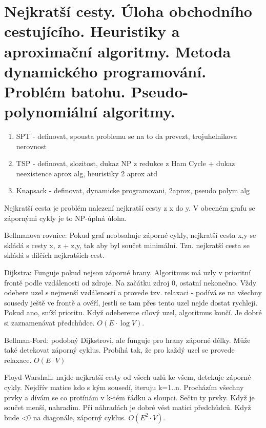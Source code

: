 \section[KO - SPT, TSP, knapsack]{Nejkratší cesty. Úloha obchodního cestujícího. Heuristiky a aproximační algoritmy. Metoda dynamického programování. Problém batohu. Pseudo-polynomiální algoritmy.}

\begin{enumerate}
\item SPT - definovat, spousta problemu se na to da prevezt, trojuhelnikova nerovnost\item TSP - definovat, slozitost, dukaz NP z redukce z Ham Cycle + dukaz neexistence aprox alg, heuristiky 2 aprox atd\item Knapsack - definovat, dynamicke programovani, 2aprox, pseudo polym alg
\end{enumerate}

Nejkratší cesta je problém nalezení nejkratší cesty z x do y. V obecném grafu se zápornými cykly je to NP-úplná úloha.

Bellmanova rovnice: Pokud graf neobsahuje záporné cykly, nejkratší cesta x,y se skládá s cesty x, z + z,y, tak aby byl součet minimální. Tzn. nejkratší cesta se skládá s dílčích nejkratších cest.

Dijkstra: Funguje pokud nejsou záporné hrany. Algoritmus má uzly v prioritní frontě podle vzdálenosti od zdroje. Na začátku zdroj 0, ostatní nekonečno. Vždy odebere uzel s nejmenší vzdáleností a provede tzv. relaxaci - podívá se na všechny sousedy ještě ve frontě a ověří, jestli se tam přes tento uzel nejde dostat rychleji. Pokud ano, sníží prioritu. Když odebereme cílový uzel, algoritmus končí. Je dobré si zaznamenávat předchůdce. $O(E\cdot \log V)$.

Bellman-Ford: podobný Dijkstrovi, ale funguje pro hrany záporné délky. Může také detekovat záporný cyklus. Probíhá tak, že pro každý uzel se provede relaxace. $O(E\cdot V)$

Floyd-Warshall: najde nejkratší cesty od všech uzlů ke všem, detekuje záporné cykly. Nejdřív matice kdo s kým sousedí, iteruju k=1..n. Procházím všechny prvky a dívám se co protínám v k-tém řádku a sloupci. Sečtu ty prvky. Když je součet menší, nahradím. Při náhradách je dobré vést matici předchůdců. Když bude <0 na diagonále, záporný cyklus. $O(E^2 \cdot V)$.

